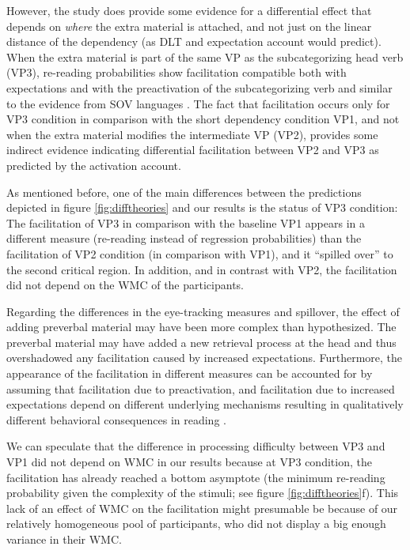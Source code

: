 \documentclass{frontiersSCNS}\usepackage{knitr}
\begin{document}
However, the study does provide some evidence for a differential effect that depends on \emph{where} the extra material is attached, and not just on the linear distance of the dependency (as DLT and expectation account would predict). When the extra material is part of the same VP as the subcategorizing head verb (VP3), re-reading probabilities show facilitation compatible both with expectations and with the preactivation of the subcategorizing verb and similar to the evidence from SOV languages \citep{Vasishth2003,VasishthLewis2006,Konieczny2000,LevyKeller2012,KoniecznyDoering2003}. The fact that facilitation occurs only for VP3 condition in comparison with the short dependency condition VP1, and not when the extra material modifies the intermediate VP (VP2), provides some indirect evidence indicating differential facilitation between VP2 and VP3 as predicted  by the activation account. 

As mentioned before, one of the main differences between the predictions depicted in figure \ref{fig:difftheories} and our results is the status of VP3 condition: The facilitation of VP3 in comparison with the baseline VP1 appears in a different measure (re-reading instead of regression probabilities) than the facilitation of VP2 condition (in comparison with VP1), and it ``spilled over'' to the second critical region. In addition, and in contrast with VP2, the facilitation did not depend on the WMC of the participants. 

Regarding the differences in the eye-tracking measures and spillover, the effect of adding preverbal material may have been more complex than hypothesized. The preverbal material may have added a new retrieval process at the head and thus overshadowed any facilitation caused by increased expectations. Furthermore, the appearance of the facilitation  in different measures can be accounted for by assuming that facilitation due to preactivation, and facilitation due to increased expectations depend on different underlying mechanisms resulting in qualitatively different behavioral consequences in reading \citep{Staub2010}.

We can speculate that the difference in processing difficulty between VP3 and VP1 did not depend on WMC in our results because at VP3 condition, the facilitation has already reached a bottom asymptote (the minimum re-reading probability given the complexity of the stimuli; see figure  \ref{fig:difftheories}f). This lack of an effect of WMC on the facilitation might presumable be because of our relatively homogeneous pool of participants, who did not display a big enough variance in their WMC.
\end{document}
